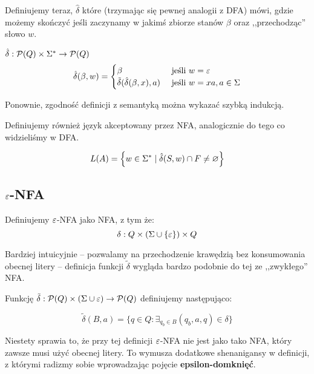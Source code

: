 Definiujemy teraz, \( \hat \delta \) które (trzymając się pewnej analogii z DFA) mówi, gdzie możemy skończyć jeśli zaczynamy w jakimś zbiorze stanów \( \beta \) oraz ,,przechodząc'' słowo \( w \).
\begin{definition}
	\( \hat \delta : \powerset\pars{Q} \times \Sigma^* \rightarrow \powerset\pars{Q} \)
	\[
		\hat \delta(\beta, w) = \begin{cases}
			\beta                                   & \text{ jeśli } w = \varepsilon             \\
			\tilde \delta(\hat \delta(\beta, x), a) & \text{ jeśli } w = xa, a \in \Sigma \\
		\end{cases}
	\]
\end{definition}

Ponownie, zgodność definicji z semantyką można wykazać szybką indukcją.

Definiujemy również język akceptowany przez NFA, analogicznie do tego co widzieliśmy w DFA.

\begin{definition}
	\[
		L(A) = \set{w \in \Sigma^* \mid \hat \delta(S, w) \cap F \neq \varnothing}
	\]
\end{definition}


\subsection{\texorpdfstring{\(\varepsilon\)}{epsilon}-NFA}

\begin{definition}
	Definiujemy \( \varepsilon \)-NFA jako NFA, z tym że:
	\[
		\delta: Q \times (\Sigma \cup \set{\eps}) \times Q
	\]
\end{definition}
Bardziej intuicyjnie -- pozwalamy na przechodzenie krawędzią bez konsumowania obecnej litery -- definicja funkcji \( \tilde \delta \) wygląda bardzo podobnie do tej ze ,,zwykłego'' NFA.

\begin{definition}
	Funkcję \(\tilde \delta : \operatorname{\mathcal{P}}(Q) \times (\Sigma \cup \varepsilon)  \rightarrow \operatorname{\mathcal{P}}(Q) \) definiujemy następująco:

	\begin{equation*}
		\tilde \delta (B, a) = \{ q \in Q : \exists_{q_b \in B}  (q_b, a, q) \in \delta \}
	\end{equation*}
\end{definition}

Niestety sprawia to, że przy tej definicji \( \varepsilon \)-NFA nie jest jako tako NFA, który zawsze musi użyć obecnej litery. To wymusza dodatkowe shenanigansy w definicji, z którymi radizmy sobie wprowadzając pojęcie \textbf{epsilon-domknięć}.

